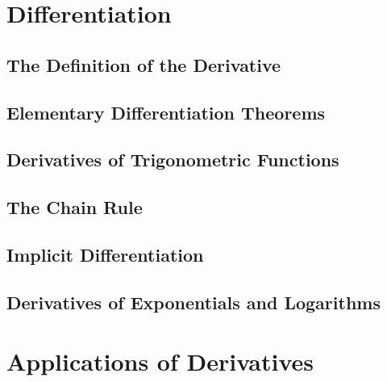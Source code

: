 \documentclass[crop=false,class=book,oneside]{standalone}
\begin{document}
    \section{Differentiation}
        \subsection{The Definition of the Derivative}
        \subsection{Elementary Differentiation Theorems}
        \subsection{Derivatives of Trigonometric Functions}
        \subsection{The Chain Rule}
        \subsection{Implicit Differentiation}
        \subsection{Derivatives of Exponentials and Logarithms}
    \section{Applications of Derivatives}
\end{document}
